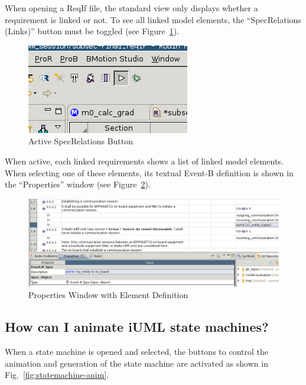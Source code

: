 \documentclass{template/openetcs_article}
\begin{document}
When opening a ReqIf file, the standard view only displays whether a
requirement is linked or not. To see all linked model elements, the
``SpecRelations (Links)'' button must be toggled (see
Figure~\ref{fig:spec-relations-button}).

\begin{figure}[H]
  \centering
  \includegraphics[width=.35\textwidth]{ProR-Link-Toggle}
  \caption{Active SpecRelations Button}
  \label{fig:spec-relations-button}
\end{figure}

When active, each linked requirements shows a list of linked model
elements. When selecting one of these elements, its textual Event-B definition
is shown in the ``Properties'' window (see
Figure~\ref{fig:properties-window-element}).

\begin{figure}[H]
  \centering
  \includegraphics[width=\textwidth]{ProR-Link-View}
  \caption{Properties Window with Element Definition}
  \label{fig:properties-window-element}
\end{figure}


\subsection{How can I animate iUML state machines?}
\label{sec:how-can-i-1}

When a state machine is opened and selected, the buttons to control the
animation and generation of the state machine are activated as shown in
Fig.~\ref{fig:statemachine-anim}. 
\end{document}
